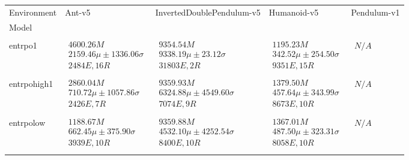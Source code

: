 \begin{tabular}{|l|p{3.2cm}|p{3.2cm}|p{3.2cm}|p{3.2cm}|}
\toprule
Environment & Ant-v5 & InvertedDoublePendulum-v5 & Humanoid-v5 & Pendulum-v1 \\
Model &  &  &  &  \\
\midrule \\ \hline
entrpo1 & $\begin{array}{c} 4600.26M \\ 2159.46\mu \pm 1336.06\sigma \\ 2484E, 16R \end{array}$ & $\begin{array}{c} 9354.54M \\ 9338.19\mu \pm 23.12\sigma \\ 31803E, 2R \end{array}$ & $\begin{array}{c} 1195.23M \\ 342.52\mu \pm 254.50\sigma \\ 9351E, 15R \end{array}$ & $\begin{array}{c} N/A \end{array}$ \\ \\ \hline
entrpohigh1 & $\begin{array}{c} 2860.04M \\ 710.72\mu \pm 1057.86\sigma \\ 2426E, 7R \end{array}$ & $\begin{array}{c} 9359.93M \\ 6324.88\mu \pm 4549.60\sigma \\ 7074E, 9R \end{array}$ & $\begin{array}{c} 1379.50M \\ 457.64\mu \pm 343.99\sigma \\ 8673E, 10R \end{array}$ & $\begin{array}{c} N/A \end{array}$ \\ \\ \hline
entrpolow & $\begin{array}{c} 1188.67M \\ 662.45\mu \pm 375.90\sigma \\ 3939E, 10R \end{array}$ & $\begin{array}{c} 9359.88M \\ 4532.10\mu \pm 4252.54\sigma \\ 8400E, 10R \end{array}$ & $\begin{array}{c} 1367.01M \\ 487.50\mu \pm 323.31\sigma \\ 8058E, 10R \end{array}$ & $\begin{array}{c} N/A \end{array}$ \\ \\ \hline

\end{tabular}
